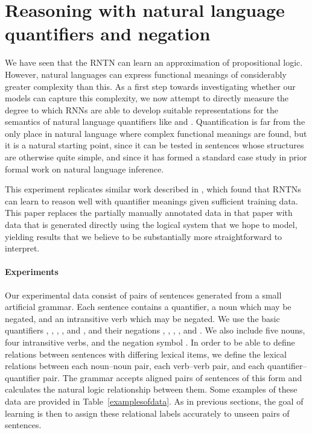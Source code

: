 \section{Reasoning with natural language quantifiers and negation}\label{sec:quantifiers}

We have seen that the RNTN can learn an approximation of propositional
logic.  However, natural languages can express functional meanings of
considerably greater complexity than this.  As a first step towards
investigating whether our models can capture this complexity, we now
attempt to directly measure the degree to which RNNs are able to
develop suitable representations for the semantics of natural language
quantifiers like  and . Quantification is far from
the only place in natural language where complex functional meanings
are found, but it is a natural starting point, since it can be tested
in sentences whose structures are otherwise quite simple, and since it
has formed a standard case study in prior formal work on natural
language inference.


This experiment replicates similar work described in
\cite{bowman2013can}, which found that RNTNs can learn to reason well
with quantifier meanings given sufficient training data. This paper
replaces the partially manually annotated data in that paper with data
that is generated directly using the logical system that we hope to
model, yielding results that we believe to be substantially more
straightforward to interpret.

\paragraph{Experiments}
Our experimental data consist of pairs of sentences generated from a
small artificial grammar. Each sentence contains a quantifier, a noun
which may be negated, and an intransitive verb which may be
negated. We use the basic quantifiers , , ,
, and , and their negations , ,
, , and . We also
include five nouns, four intransitive verbs, and the negation symbol
. In order to be able to define relations between sentences
with differing lexical items, we define the lexical relations between
each noun--noun pair, each verb--verb pair, and each
quantifier--quantifier pair. The grammar accepts aligned pairs of
sentences of this form and calculates the natural logic relationship
between them.  Some examples of these data are provided in
Table~\ref{examplesofdata}.  As in previous sections, the goal of
learning is then to assign these relational labels accurately to
unseen pairs of sentences.

